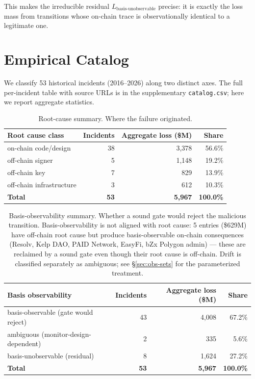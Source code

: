 \documentclass[11pt,a4paper]{article}
\begin{document}
This makes the irreducible residual $L_{\mathrm{basis\text{-}unobservable}}$ precise: it is exactly the loss mass from transitions whose on-chain trace is observationally identical to a legitimate one.

\section{Empirical Catalog}\label{sec:empirical}

We classify 53 historical incidents (2016--2026) along two distinct axes. The full per-incident table with source URLs is in the supplementary \texttt{catalog.csv}; here we report aggregate statistics.

\begin{table}[t]
\centering
\small
\begin{tabular}{lrrr}
\toprule
Root cause class & Incidents & Aggregate loss (\$M) & Share \\
\midrule
on-chain code/design & 38 & 3{,}378 & 56.6\% \\
off-chain signer & 5 & 1{,}148 & 19.2\% \\
off-chain key & 7 & 829 & 13.9\% \\
off-chain infrastructure & 3 & 612 & 10.3\% \\
\midrule
\textbf{Total} & \textbf{53} & \textbf{5{,}967} & \textbf{100.0\%} \\
\bottomrule
\end{tabular}
\caption{Root-cause summary. Where the failure originated.}\label{tab:root-cause}
\end{table}

\begin{table}[t]
\centering
\small
\begin{tabular}{lrrr}
\toprule
Basis observability & Incidents & Aggregate loss (\$M) & Share \\
\midrule
basis-observable (gate would reject) & 43 & 4{,}008 & 67.2\% \\
ambiguous (monitor-design-dependent) & 2 & 335 & 5.6\% \\
basis-unobservable (residual) & 8 & 1{,}624 & 27.2\% \\
\midrule
\textbf{Total} & \textbf{53} & \textbf{5{,}967} & \textbf{100.0\%} \\
\bottomrule
\end{tabular}
\caption{Basis-observability summary. Whether a sound gate would reject the malicious transition. Basis-observability is not aligned with root cause: 5 entries (\$629M) have off-chain root cause but produce basis-observable on-chain consequences (Resolv, Kelp DAO, PAID Network, EasyFi, bZx Polygon admin) — these are reclaimed by a sound gate even though their root cause is off-chain. Drift is classified separately as ambiguous; see §\ref{sec:obs-sets} for the parameterized treatment.}\label{tab:basis-obs}
\end{table}
\end{document}
